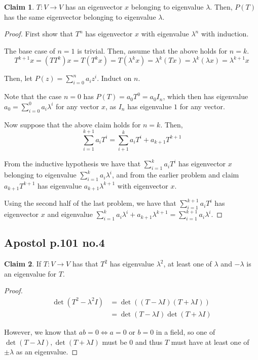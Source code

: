 \documentclass[12pt,letterpaper]{article}
\theoremstyle{definition}
\newtheorem*{claim}{Claim}
\begin{document}
\begin{claim}
  $T: V \rightarrow V$ has an eigenvector $x$ belonging to eigenvalue $\lambda$.
  Then, $P(T)$ has the same eigenvector belonging to eigenvalue $\lambda$.
\end{claim}

\begin{proof}
  First show that $T^n$ has eigenvector $x$ with eigenvalue $\lambda^n$ with
  induction.

  The base case of $n = 1$ is trivial. Then, assume that the above holds for $n
  = k$. \[T^{k+1}x = (TT^k)x = T(T^kx) = T(\lambda^k x) = \lambda^k(Tx) =
    \lambda^k(\lambda x) = \lambda^{k+1}x\]

  Then, let $P(z) = \sum_{i=0}^na_iz^i$. Induct on $n$.

  Note that the case $n = 0$ has $P(T) = a_0T^0 = a_0I_n$, which then has
  eigenvalue $a_0 = \sum_{i=0}^0a_i\lambda^i$ for any vector $x$, as $I_n$ has eigenvalue $1$ for any vector. 

  Now suppose that the above claim holds for $n = k$. Then,
  \[
    \sum_{i=1}^{k+1}a_iT^i = \sum_{i+1}^ka_iT^i + a_{k+1}T^{k+1}
  \]

  From the inductive hypothesis we have that $\sum_{i=1}^ka_iT^i$ has
  eigenvector $x$ belonging to eigenvalue $\sum_{i=1}^ka_i\lambda^i$, and from
  the earlier problem and claim $a_{k+1}T^{k+1}$ has eigenvalue
  $a_{k+1}\lambda^{k+1}$ with eigenvector $x$.

  Using the second half of the last problem, we have that
  $\sum_{i=1}^{k+1}a_iT^i$ has eigenvector $x$ and eigenvalue
  $\sum_{i=1}^{k}a_i\lambda^i + a_{k+1}\lambda^{k+1} = \sum_{i=1}^{k+1}a_i\lambda^i$.
\end{proof}

\subsection*{Apostol p.101 no.4}

\begin{claim}
  If $T: V \rightarrow V$ has that $T^2$ has eigenvalue $\lambda^2$, at least
  one of $\lambda$ and $-\lambda$ is an eigenvalue for $T$.
\end{claim}

\begin{proof}
  \begin{align*}
    \det(T^2 - \lambda^2I) &= \det((T - \lambda I)(T + \lambda I)) \\
                           &= \det(T - \lambda I)\det(T + \lambda I) 
  \end{align*}

  However, we know that $ab = 0 \iff a = 0$ or $b = 0$ in a field, so one of
  $\det(T - \lambda I), \det(T + \lambda I)$ must be 0 and thus $T$ must have at
  least one of $\pm \lambda$ as an eigenvalue.
\end{proof}
\end{document}
